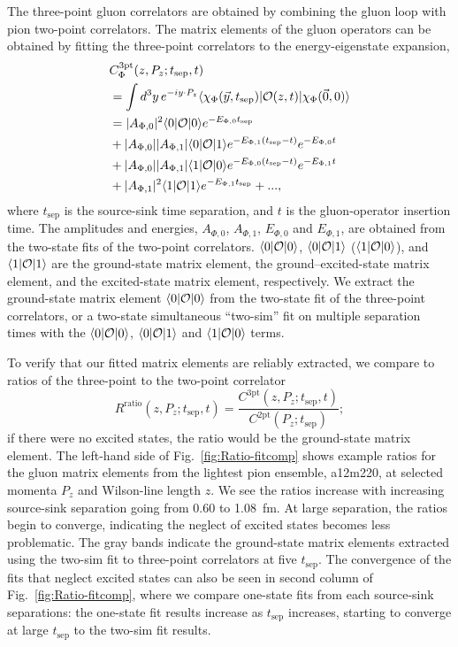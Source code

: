 The three-point gluon correlators are obtained by combining the gluon loop with pion two-point correlators.
The matrix elements of the gluon operators can be obtained by fitting the three-point correlators to the energy-eigenstate expansion,
%
\begin{align}\label{eq:3ptC}
&C_\Phi^\text{3pt}(z,P_z;t_\text{sep},t) \nonumber \\
&=\int d^3y\, e^{-iy\cdot P_z}\langle \chi_\Phi(\vec y,t_\text{sep})|{\cal O}(z,t)|\chi_\Phi(\vec 0,0)\rangle \nonumber \\
&= |A_{\Phi,0}|^2\langle 0|{\cal O}|0\rangle e^{-E_{\Phi,0}t_\text{sep}} \nonumber \\
&+ |A_{\Phi,0}||A_{\Phi,1}|\langle 0|{\cal O}|1\rangle e^{-E_{\Phi,1}(t_\text{sep}-t)}e^{-E_{\Phi,0}t} \nonumber \\
&+ |A_{\Phi,0}||A_{\Phi,1}|\langle 1|{\cal O}|0\rangle e^{-E_{\Phi,0}(t_\text{sep}-t)}e^{-E_{\Phi,1}t} \nonumber \\
&+ |A_{\Phi,1}|^2\langle 1|{\cal O}|1\rangle e^{-E_{\Phi,1}t_\text{sep}}+ ...,
\end{align}
%
where $t_\text{sep}$ is the source-sink time separation,
and $t$ is the gluon-operator insertion time.
The amplitudes and energies, $A_{\Phi,0}$, $A_{\Phi,1}$, $E_{\Phi,0}$ and $E_{\Phi,1}$, are obtained from the two-state fits of the two-point correlators.
$\langle 0|{\cal O}|0\rangle$, $\langle 0|{\cal O}|1\rangle$ ($\langle 1|{\cal O}|0\rangle$), and $\langle 1|{\cal O}|1\rangle$ are the ground-state matrix element, the ground--excited-state matrix element, and the excited-state matrix element, respectively.
We extract the ground-state matrix element $\langle 0|{\cal O}|0\rangle$ from the two-state fit of the three-point correlators, or a two-state simultaneous ``two-sim'' fit on multiple separation times with the $\langle 0|{\cal O}|0\rangle$, $\langle 0|{\cal O}|1\rangle$ and $\langle 1|{\cal O}|0\rangle$ terms.

To verify that our fitted matrix elements are reliably extracted, we compare to ratios of the three-point to the two-point correlator
%
\begin{equation}\label{eq:Ratio}
R^\text{ratio}(z,P_z;t_\text{sep},t) = \frac{C^\text{3pt}(z,P_z;t_\text{sep},t)}{C^\text{2pt}(P_z;t_\text{sep})};
\end{equation}
%
if there were no excited states, the ratio would be the ground-state matrix element.
The left-hand side of Fig.~\ref{fig:Ratio-fitcomp} shows example ratios for the gluon matrix elements from the lightest pion ensemble, a12m220, at selected momenta $P_z$ and Wilson-line length $z$.
We see the ratios increase with increasing source-sink separation going from 0.60 to 1.08~fm.
At large separation, the ratios begin to converge, indicating the neglect of excited states becomes less problematic.
The gray bands indicate the ground-state matrix elements extracted using the two-sim fit to three-point correlators at five $t_\text{sep}$.
The convergence of the fits that neglect excited states can also be seen in second column of Fig.~\ref{fig:Ratio-fitcomp}, where we compare one-state fits from each source-sink separations:
the one-state fit results increase as $t_\text{sep}$ increases, starting to converge at large $t_\text{sep}$ to the two-sim fit results.

